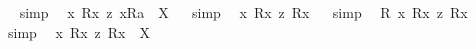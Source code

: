 \begin{isabellebody}
\isadelimproof
\ %
\endisadelimproof
%
\isatagproof
{}\isamarkupfalse%
\ {\isacharparenleft}simp{\isacharparenright}\ \isamarkupfalse%
%
\endisatagproof
{\isafoldproof}%
%
\isadelimproof
%
\endisadelimproof
\isanewline
{}\isamarkupfalse%
\ {\isachardoublequoteopen}{\isacharless}{\isasymlambda}x{\isachardot}\ {\isacharless}R{}{\isasymbullet}{\isachardot}x{\isachardot}{\isachargreater}\ {\isasymrightarrow}\isactrlsup z\ {\isacharless}{\isachardot}x{\isachardot}{\isasymcirc}R{}{\isachargreater}{\isacharparenright}{\isasymbullet}a{\isachargreater}\ {\isacharequal}\ X{\isachardoublequoteclose}%
\isadelimproof
\ %
\endisadelimproof
%
\isatagproof
{}\isamarkupfalse%
\ {\isacharparenleft}simp{\isacharparenright}\ \isamarkupfalse%
%
\endisatagproof
{\isafoldproof}%
%
\isadelimproof
%
\endisadelimproof
\isanewline
\isanewline
{}\isamarkupfalse%
\ {\isachardoublequoteopen}{\isacharbrackleft}{\isasymforall}{\isacharparenleft}{\isasymlambda}x{\isachardot}\ {\isacharless}R{}{\isasymbullet}{\isachardot}x{\isachardot}{\isachargreater}\ {\isasymrightarrow}\isactrlsup z\ {\isacharless}R{}{\isasymbullet}{\isachardot}x{\isachardot}{\isachargreater}{\isacharparenright}{\isacharbrackright}{\isachardoublequoteclose}%
\isadelimproof
\ %
\endisadelimproof
%
\isatagproof
{}\isamarkupfalse%
\ {\isacharparenleft}simp{\isacharparenright}\ \isamarkupfalse%
%
\endisatagproof
{\isafoldproof}%
%
\isadelimproof
%
\endisadelimproof
\isanewline
{}\isamarkupfalse%
\ {\isachardoublequoteopen}{\isacharbrackleft}{\isasymforall}{\isacharparenleft}{\isasymlambda}R{\isachardot}\ {\isasymforall}{\isacharparenleft}{\isasymlambda}x{\isachardot}\ {\isacharless}{\isachardot}R{\isachardot}{\isasymbullet}{\isachardot}x{\isachardot}{\isachargreater}\ {\isasymrightarrow}\isactrlsup z\ {\isacharless}{\isachardot}R{\isachardot}{\isasymbullet}{\isachardot}x{\isachardot}{\isachargreater}{\isacharparenright}{\isacharparenright}{\isacharbrackright}{\isachardoublequoteclose}%
\isadelimproof
\ %
\endisadelimproof
%
\isatagproof
{}\isamarkupfalse%
\ {\isacharparenleft}simp{\isacharparenright}\ \isamarkupfalse%
%
\endisatagproof
{\isafoldproof}%
%
\isadelimproof
%
\endisadelimproof
\isanewline
{}\isamarkupfalse%
\ {\isachardoublequoteopen}{\isasymforall}{\isacharparenleft}{\isasymlambda}x{\isachardot}\ {\isacharless}R{}{\isasymbullet}{\isachardot}x{\isachardot}{\isachargreater}\ {\isasymrightarrow}\isactrlsup z\ {\isacharless}R{}{\isasymbullet}{\isachardot}x{\isachardot}{\isachargreater}{\isacharparenright}\ {\isacharequal}\ X{\isachardoublequoteclose}%

\end{isabellebody}

